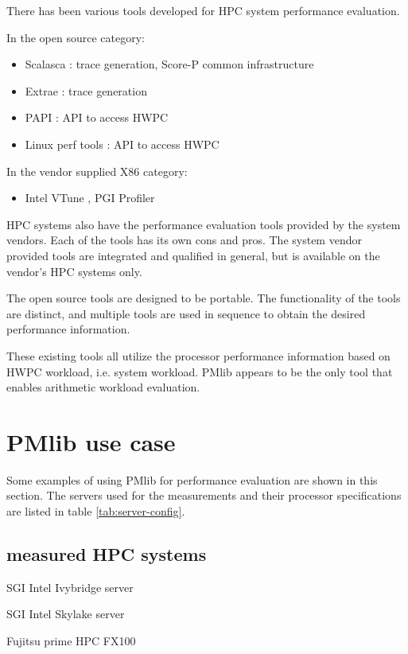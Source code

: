 \documentclass[conference]{IEEEtran}
\begin{document}
There has been various tools developed for HPC system  performance evaluation.

In the open source category:
\begin{itemize}
	\item Scalasca \cite{Scalasca:2017} : trace generation, Score-P common
	infrastructure
	\item Extrae \cite{Extrae:webpage} :  trace generation
	\item PAPI \cite{PAPI:5.6} : API to access HWPC
	\item Linux perf tools : API to access HWPC
\end{itemize}

In the vendor supplied X86 category:
\begin{itemize}
		\item Intel VTune \cite{Intel:VTune}, PGI Profiler \cite{PGI:Profiler}
\end{itemize}

HPC systems also have the performance evaluation tools provided by the
system vendors.
Each of the tools has its own cons and pros.
The system vendor provided tools are integrated and qualified in general,
but is available on the vendor's HPC systems only.

The open source tools are designed to be portable. The functionality of the
tools are distinct, and multiple tools are used in sequence to obtain
the desired performance information.

These existing tools all utilize the processor performance information
based on HWPC workload, i.e. system workload.
PMlib appears to be the only tool that enables arithmetic workload
evaluation.



\section{PMlib use case}


Some examples of using PMlib for performance evaluation are shown in this
section.
The servers used for the measurements and their processor specifications
are listed in table \ref{tab:server-config}.

\subsection{measured HPC systems}

\begin{itemize}
{
\item SGI Intel Ivybridge server
\item SGI Intel Skylake server
\item Fujitsu prime HPC FX100
}
\end{itemize}
\end{document}
